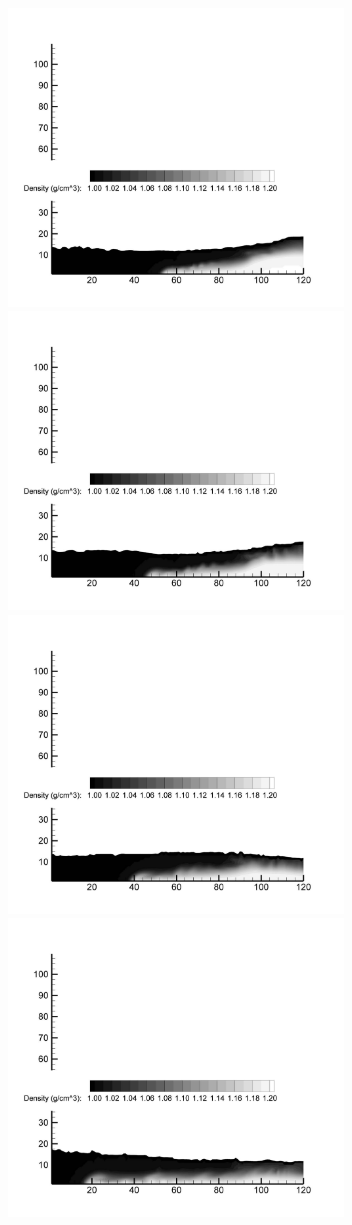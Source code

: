\begin{figure}[h]
\begin{center}
\includegraphics[width=3.5in]{../figures/SRM/100.pdf}
\includegraphics[width=3.5in]{../figures/SRM/125.pdf}
\includegraphics[width=3.5in]{../figures/SRM/150.pdf}
\includegraphics[width=3.5in]{../figures/SRM/200.pdf}

\end{center}
\end{figure}
